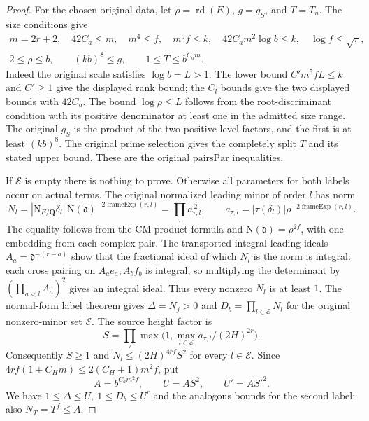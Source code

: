 \begin{proof}
For the chosen original data, let \(\rho=\operatorname{rd}(E)\),
\(g=g_S\), and \(T=T_u\). The size conditions give
\[
 \begin{gathered}
 m=2r+2,\quad 42C_a\le m,\quad
 m^4\le f,\quad m^5 f\le k,\quad
 42C_a m^2\log b\le k,\quad \log f\le\sqrt r,\\
 2\le\rho\le b,\qquad (kb)^8\le g,\qquad
 1\le T\le b^{C_am}.
 \tag{RC3}
 \end{gathered}
\]
Indeed the original scale satisfies \(\log b=L>1\).
The lower bound \(C'm^5 fL\le k\) and \(C'\ge1\)
give the displayed rank bound; the \(C_l\) bounds give
the two displayed bounds with \(42C_a\). The bound
\(\log\rho\le L\) follows from the root-discriminant
condition with its positive denominator at least one
in the admitted size range. The original \(g_S\) is
the product of the two positive level factors, and the
first is at least \((kb)^8\). The original prime
selection gives the completely split \(T\) and its
stated upper bound. These are the original
\(\mathrm{pairsPar}\) inequalities.

If \(\mathscr S\) is empty there is nothing to prove.
Otherwise all parameters for both labels occur on
actual terms. The original normalized leading minor
of order \(l\) has norm
\[
 N_l=|\mathrm N_{E/\mathbf Q}\delta_l|\,
        \mathrm N(\mathfrak d)^{-2\operatorname{frameExp}(r,l)}
    =\prod_{\tau} a_{\tau,l}^{\,2},\qquad
 a_{\tau,l}=|\tau(\delta_l)|\rho^{-2\operatorname{frameExp}(r,l)}.
 \tag{RC4}
\]
The equality follows from the CM product formula
and \(\mathrm N(\mathfrak d)=\rho^{2f}\), with one
embedding from each complex pair. The transported
integral leading ideals \(A_a=\mathfrak d^{-(r-a)}\)
show that the fractional ideal of which \(N_l\) is the
norm is integral: each cross pairing on \(A_ae_a,A_bf_b\)
is integral, so multiplying the determinant by
\((\prod_{a<l}A_a)^2\) gives an integral ideal.
Thus every nonzero \(N_l\) is at least \(1\).
The normal-form label theorem gives
\(\Delta=N_j>0\) and \(D_b=\prod_{l\in\mathcal E}N_l\)
for the original nonzero-minor set \(\mathcal E\).
The source height factor is
\[
 S=\prod_\tau\max\bigl(1,\max_{l\in\mathcal E}
              a_{\tau,l}/(2H)^{2r}\bigr).
\]
Consequently \(S\ge1\) and
\(N_l\le (2H)^{4rf} S^2\) for every \(l\in\mathcal E\).
Since \(4rf(1+C_Hm)\le2(C_H+1)m^2f\), put
\[
 A=b^{C_a m^2 f},\qquad U=AS^2,\qquad U'=AS'^2.
\]
We have \(1\le\Delta\le U,\ 1\le D_b\le U^r\)
and the analogous bounds for the second label;
also \(N_T=T^f\le A\).


\end{proof}
